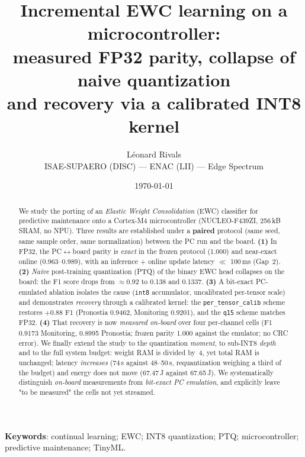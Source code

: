 \documentclass[11pt,a4paper]{article}
\title{Incremental EWC learning on a microcontroller:\\
measured FP32 parity, collapse of naive quantization\\
and recovery via a calibrated INT8 kernel}
\author{Léonard Rivals\\
\small ISAE-SUPAERO (DISC) --- ENAC (LII) --- Edge Spectrum}
\date{\today}
\providecommand{\num}[1]{#1}
\providecommand{\numrange}[2]{#1--#2}
\providecommand{\SI}[2]{#1\,#2}
\providecommand{\SIrange}[3]{#1--#2\,#3}
\providecommand{\micro}{\textmu}
\providecommand{\second}{s}
\providecommand{\milli}{m}
\providecommand{\kilo}{k}
\providecommand{\byte}{B}
\providecommand{\joule}{J}
\begin{document}
\maketitle

\begin{abstract}
We study the porting of an \emph{Elastic Weight Consolidation} (EWC) classifier for predictive maintenance
onto a Cortex-M4 microcontroller (NUCLEO-F439ZI, \SI{256}{\kilo\byte} SRAM, no NPU). Three results are
established under a \textbf{paired} protocol (same seed, same sample order, same normalization) between the
PC run and the board. \textbf{(1)} In FP32, the PC$\leftrightarrow$board parity is \emph{exact} in the
frozen protocol (\num{1.000}) and near-exact online (\numrange{0.963}{0.989}), with an inference + online
update latency $\ll$ \SI{100}{\milli\second} (Gap~2). \textbf{(2)} \emph{Naive} post-training quantization
(PTQ) of the binary EWC head collapses on the board: the F1 score drops from $\approx\!\num{0.92}$ to
\num{0.138} and \num{0.1337}. \textbf{(3)} A bit-exact PC-emulated ablation isolates the cause (\texttt{int8}
accumulator, uncalibrated per-tensor scale) and demonstrates \emph{recovery} through a calibrated kernel:
the \texttt{per\_tensor\_calib} scheme restores $+\!\num{0.88}$ F1 (Pronostia \num{0.9462}, Monitoring
\num{0.9201}), and the \texttt{q15} scheme matches FP32. \textbf{(4)} That recovery is now \emph{measured
on-board} over four per-channel cells (F1 \num{0.9173} Monitoring, \num{0.8995} Pronostia; frozen parity
\num{1.000} against the emulator; no CRC error). We finally extend the study to the quantization
\emph{moment}, to sub-INT8 \emph{depth} and to the full system budget: weight RAM is divided by~4, yet total
RAM is unchanged; latency \emph{increases} (\SI{74}{\micro\second} against \SIrange{48}{50}{\micro\second},
requantization weighing a third of the budget) and energy does not move (\SI{67.47}{\micro\joule} against
\SI{67.65}{\micro\joule}). We systematically distinguish \emph{on-board} measurements from \emph{bit-exact
PC emulation}, and explicitly leave "to be measured" the cells not yet streamed.
\end{abstract}

\noindent\textbf{Keywords}: continual learning; EWC; INT8 quantization; PTQ; microcontroller; predictive
maintenance; TinyML.










\end{document}
